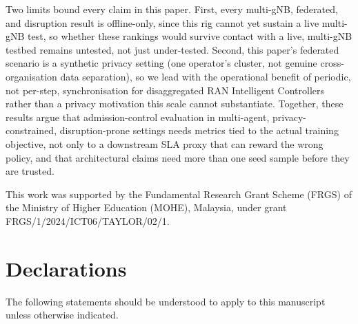 \documentclass[pdflatex,sn-basic,Numbered]{sn-jnl}%
\begin{document}
Two limits bound every claim in this paper. First, every multi-gNB, federated, and disruption result is offline-only, since this rig cannot yet sustain a live multi-gNB test, so whether these rankings would survive contact with a live, multi-gNB testbed remains untested, not just under-tested.
Second, this paper's federated scenario is a synthetic privacy setting (one operator's cluster, not genuine cross-organisation data separation), so we lead with the operational benefit of periodic, not per-step, synchronisation for disaggregated RAN Intelligent Controllers rather than a privacy motivation this scale cannot substantiate. Together, these results argue that admission-control
evaluation in multi-agent, privacy-constrained, disruption-prone
settings needs metrics tied to the actual training objective, not only
to a downstream SLA proxy that can reward the wrong policy, and that
architectural claims need more than one seed sample before they are
trusted.

\backmatter

This work was supported by the Fundamental Research Grant Scheme
(FRGS) of the Ministry of Higher Education (MOHE), Malaysia, under
grant FRGS/1/2024/ICT06/TAYLOR/02/1.

\section*{Declarations}

\noindent The following statements should be understood to apply to
this manuscript unless otherwise indicated.
\end{document}
